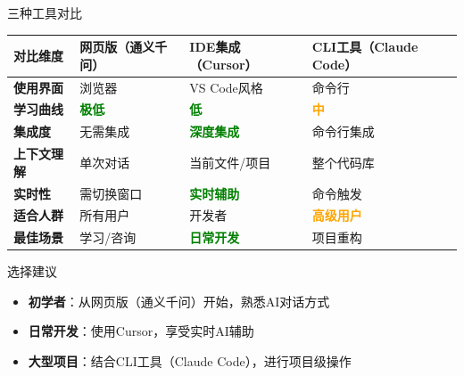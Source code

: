 \begin{frame}{三种工具对比}
	\begin{table}
		\centering
		\small
		\begin{tabular}{p{2.5cm}p{3cm}p{3cm}p{3cm}}
			\toprule
			\textbf{对比维度} & \textbf{网页版（通义千问）} & \textbf{IDE集成（Cursor）} & \textbf{CLI工具（Claude Code）} \\
			\midrule
			\textbf{使用界面} & 浏览器 & VS Code风格 & 命令行 \\
			\textbf{学习曲线} & \textcolor{green}{\textbf{极低}} & \textcolor{green}{\textbf{低}} & \textcolor{orange}{\textbf{中}} \\
			\textbf{集成度} & 无需集成 & \textcolor{green}{\textbf{深度集成}} & 命令行集成 \\
			\textbf{上下文理解} & 单次对话 & 当前文件/项目 & 整个代码库 \\
			\textbf{实时性} & 需切换窗口 & \textcolor{green}{\textbf{实时辅助}} & 命令触发 \\
			\textbf{适合人群} & 所有用户 & 开发者 & \textcolor{orange}{\textbf{高级用户}} \\
			\textbf{最佳场景} & 学习/咨询 & \textcolor{green}{\textbf{日常开发}} & 项目重构 \\
			\bottomrule
		\end{tabular}
	\end{table}

	\vspace{0.3cm}

	\begin{block}{选择建议}
		\begin{itemize}
			\item \textbf{初学者}：从网页版（通义千问）开始，熟悉AI对话方式
			\item \textbf{日常开发}：使用Cursor，享受实时AI辅助
			\item \textbf{大型项目}：结合CLI工具（Claude Code），进行项目级操作
		\end{itemize}
	\end{block}
\end{frame}

